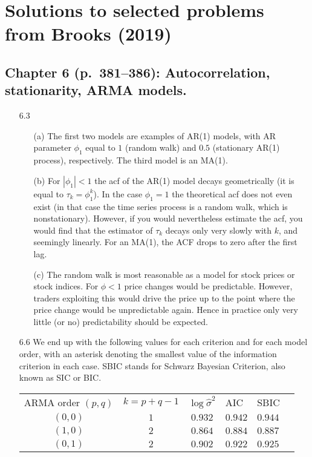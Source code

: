 \documentclass[11pt,a4paper]{article}
\begin{document}
\section*{Solutions to selected problems from Brooks (2019)}
\subsection*{Chapter 6 (p.\ 381--386): Autocorrelation, stationarity, ARMA models.}


\begin{itemize}
\item[6.3]
\begin{enumerate}
\item[(a)] The first two models are examples of AR(1) models, with AR parameter $\phi_1$ equal to $1$ (random walk) and $0.5$ (stationary AR(1) process), respectively. The third model is an MA(1).
\item[(b)] For $|\phi_1| < 1$ the acf of the AR(1) model decays geometrically
(it is equal to $\tau_k = \phi_1^k$).  In the case $\phi_1=1$ the theoretical
acf does not even exist (in that case the time series process is a random walk,
which is nonstationary). However, if you would nevertheless estimate the
acf, you would find that the estimator of $\tau_k$ decays only very slowly
with $k$, and seemingly linearly. For an MA(1), the ACF drops to zero after the first lag.
\item[(c)] The random walk is most reasonable as a model for stock prices or stock indices. For $\phi<1$ price changes would be predictable. However, traders
exploiting this would drive the price up to the point where the price change would be unpredictable again. Hence in practice only very little (or no)
predictability should be expected.
\end{enumerate}
\item[6.6] We end up with the following values for
each criterion and for each model order, with an asterisk denoting the smallest
value of the information criterion in each case. SBIC stands for Schwarz Bayesian Criterion, also known as SIC or BIC.
\begin{center}
\begin{tabular}{ccclll}
ARMA order $(p,q)$ & $k=p+q-1$ & $\log \hat \sigma^2$ & AIC & SBIC \\
 $(0,0)$ & $1$ & $0.932$ & $0.942$ & $0.944$ \\
 $(1,0)$ & $2$ & $0.864$ & $0.884$ & $0.887$ \\
 $(0,1)$ & $2$ & $0.902$ & $0.922$ & $0.925$ \\

\end{tabular}
\end{center}
\end{itemize}
\end{document}
